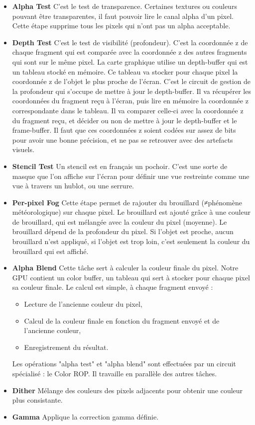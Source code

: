\begin{itemize}
	\item{\textbf{Alpha Test}}
C’est le test de transparence. Certaines textures ou couleurs pouvant être transparentes, il faut pouvoir lire le canal alpha d’un pixel. Cette étape supprime tous les pixels qui n’ont pas un alpha acceptable.
\\
	\item{\textbf{Depth Test}}
C’est le test de visibilité (profondeur). C’est la coordonnée z de chaque fragment qui est comparée avec la coordonnée z des autres fragments qui sont sur le même pixel. La carte graphique utilise un depth-buffer qui est un tableau stocké en mémoire. Ce tableau va stocker pour chaque pixel la coordonnée z de l’objet le plus proche de l’écran.
C’est le circuit de gestion de la profondeur qui s’occupe de mettre à jour le depth-buffer. Il va récupérer les coordonnées du fragment reçu à l’écran, puis lire en mémoire la coordonnée z correspondante dans le tableau. Il va comparer celle-ci avec la coordonnée z du fragment reçu, et décider ou non de mettre à jour le depth-buffer et le frame-buffer.
Il faut que ces coordonnées z soient codées sur assez de bits pour avoir une bonne précision, et ne pas se retrouver avec des artefacts visuels.
\\
	\item{\textbf{Stencil Test}}
Un stencil est en  français un pochoir. C’est une sorte de masque que l’on affiche sur l’écran pour définir une vue restreinte comme une vue à travers un hublot, ou une serrure.
\\
	\item{\textbf{Per-pixel Fog}}
Cette étape permet de rajouter du brouillard (≠phénomène météorologique) sur chaque pixel. Le brouillard est ajouté grâce à une couleur de brouillard, qui est mélangée avec la couleur du pixel (moyenne). Le brouillard dépend de la profondeur du pixel. Si l’objet est proche, aucun brouillard n’est appliqué, si l’objet est trop loin, c’est seulement la couleur du brouillard qui est affiché.
\\
	\item{\textbf{Alpha Blend}}
Cette tâche sert à calculer la couleur finale du pixel. Notre GPU contient un color buffer, un tableau qui sert à stocker pour chaque pixel sa couleur finale.
Le calcul est simple, à chaque fragment envoyé :
\begin{itemize}
	\item Lecture de l’ancienne couleur du pixel,
	\item Calcul de la couleur finale en fonction du fragment envoyé et de l’ancienne couleur,
	\item Enregistrement du résultat.
\end{itemize}
Les opérations "alpha test" et "alpha blend" sont effectuées par un circuit spécialisé : le Color ROP. Il travaille en parallèle des autres tâches.
\\
	\item{\textbf{Dither}}
Mélange des couleurs des pixels adjacents pour obtenir une couleur plus consistante.
\\
	\item{\textbf{Gamma}}
Applique la correction gamma définie.
\end{itemize}
